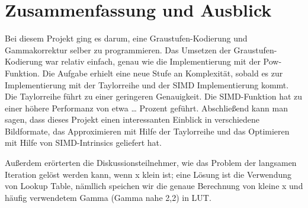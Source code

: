 \documentclass[course=erap]{aspdoc}
\begin{document}
\section{Zusammenfassung und Ausblick}

\par
Bei diesem Projekt ging es darum, eine Graustufen-Kodierung und Gammakorrektur selber zu programmieren. Das Umsetzen der Graustufen-Kodierung war relativ einfach, genau wie die Implementierung mit der Pow-Funktion. Die Aufgabe erhielt eine neue Stufe an Komplexität, sobald es zur Implementierung mit der Taylorreihe und der SIMD Implementierung kommt. Die Taylorreihe führt zu einer geringeren Genauigkeit. Die SIMD-Funktion hat zu einer höhere Performanz von etwa … Prozent geführt. Abschließend kann man sagen, dass dieses Projekt einen interessanten Einblick in verschiedene Bildformate, das Approximieren mit Hilfe der Taylorreihe und das Optimieren mit Hilfe von SIMD-Intrinsics geliefert hat.

\par
Außerdem erörterten die Diskussionsteilnehmer, wie das Problem der langsamen Iteration gelöst werden kann, wenn x klein ist; eine Lösung ist die Verwendung von Lookup Table\cite{jungck2011packetC}, nämllich speichen wir die genaue Berechnung von kleine x und häufig verwendetem Gamma (Gamma nahe 2,2) in LUT.



\end{document}
